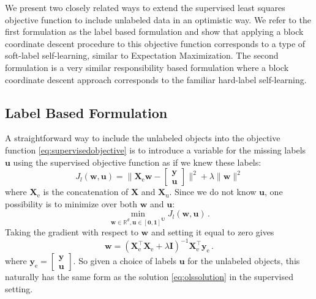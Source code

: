 \documentclass[conference,a4paper,10pt]{IEEEtran}\usepackage[]{graphicx}\usepackage[]{color}
\newcommand{\Xe}{\mathbf{X}_\textrm{e}}
\begin{document}
We present two closely related ways to extend the supervised least squares objective function to include unlabeled data in an optimistic way. We refer to the first formulation as the label based formulation and show that applying a block coordinate descent procedure to this objective function corresponds to a type of soft-label self-learning, similar to Expectation Maximization. The second formulation is a very similar responsibility based formulation where a block coordinate descent approach corresponds to the familiar hard-label self-learning.

\subsection{Label Based Formulation}
A straightforward way to include the unlabeled objects into the objective function \eqref{eq:supervisedobjective} is to introduce a variable for the missing labels $\mathbf{u}$ using the supervised objective function as if we knew these labels:
$$
J_l(\mathbf{w},\mathbf{u}) = \| \Xe \mathbf{w}-\begin{bmatrix} \mathbf{y} \\ \mathbf{u} \end{bmatrix} \|^2 + \lambda \|\mathbf{w} \|^2
$$
where $\Xe$ is the concatenation of $\mathbf{X}$ and $\mathbf{X}_\text{u}$. Since we do not know $\mathbf{u}$, one possibility is to minimize over both $\mathbf{w}$ and $\mathbf{u}$:
$$
\min_{\mathbf{w}\in \mathbb{R}^d,\mathbf{\mathbf{u} \in [0,1]^U}} J_l(\mathbf{w},\mathbf{u}) \,.
$$
Taking the gradient with respect to $\mathbf{w}$ and setting it equal to zero gives
$$
\mathbf{w} = \left( \mathbf{X}_\text{e}^\top \mathbf{X}_\text{e}  + \lambda \mathbf{I} \right)^{-1} \mathbf{X}_\text{e}^\top \mathbf{y}_\text{e} \,.
$$
where $\mathbf{y}_\text{e}=\begin{bmatrix} \mathbf{y} \\ \mathbf{u} \end{bmatrix}$. So given a choice of labels $\mathbf{u}$ for the unlabeled objects, this naturally has the same form as the solution \eqref{eq:olssolution} in the supervised setting.
\end{document}
